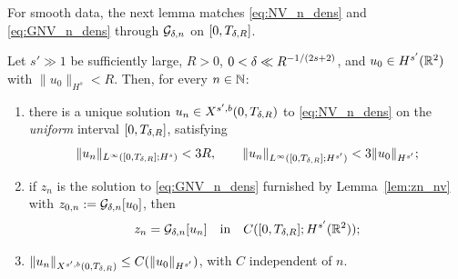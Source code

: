 For smooth data, the next lemma matches \eqref{eq:NV_n_dens} and
\eqref{eq:GNV_n_dens} through $\mathcal{G}_{\delta,n}$ on $[0,T_{\delta,R}]$.

\begin{lemma}\label{lem:equiv_n_nv}
Let $s'\gg 1$ be sufficiently large, $R>0$,
$0<\delta\ll R^{-1/(2s+2)}$, and $u_0\in H^{s'}(\mathbb{R}^2)$ with
$\|u_0\|_{H^s}<R$. Then, for every $n\in\mathbb{N}$:
\begin{enumerate}
\item[\textup{(i)}] there is a unique solution
$u_n\in X^{s',b}(0,T_{\delta,R})$ to \eqref{eq:NV_n_dens} on the
\emph{uniform} interval $[0,T_{\delta,R}]$, satisfying
\begin{equation}\label{eq:bounds_un}
\|u_n\|_{L^\infty([0,T_{\delta,R}];H^s)}<3R,
\qquad
\|u_n\|_{L^\infty([0,T_{\delta,R}];H^{s'})}<3\|u_0\|_{H^{s'}};
\end{equation}
\item[\textup{(ii)}] if $z_n$ is the solution to
\eqref{eq:GNV_n_dens} furnished by Lemma~\ref{lem:zn_nv} with
$z_{0,n}:=\mathcal{G}_{\delta,n}[u_0]$, then
\begin{equation}\label{eq:equiv_n_nv}
z_n=\mathcal{G}_{\delta,n}[u_n]
\quad\text{in}\quad C([0,T_{\delta,R}];H^{s'}(\mathbb{R}^2));
\end{equation}
\item[\textup{(iii)}] $\|u_n\|_{X^{s',b}(0,T_{\delta,R})}\le
C(\|u_0\|_{H^{s'}})$, with $C$ independent of $n$.
\end{enumerate}
\end{lemma}

